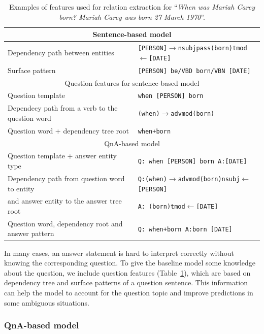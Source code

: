\begin{table}[t]
\footnotesize
\centering
\begin{tabular}{p{6.2cm}|p{6.6cm}}
\multicolumn{2}{c}{Sentence-based model}\\
\hline
Dependency path between entities & \texttt{[PERSON]$\rightarrow$nsubjpass(born)tmod$\leftarrow$[DATE]}\\
Surface pattern & \texttt{[PERSON] be/VBD born/VBN [DATE]}\\
\hline
\multicolumn{2}{c}{Question features for sentence-based model}\\
\hline
Question template & \texttt{when [PERSON] born}\\
Dependecy path from a verb to the question word & \texttt{(when)$\rightarrow$advmod(born)}\\
Question word + dependency tree root & \texttt{when+born}\\
\hline
\multicolumn{2}{c}{QnA-based model}\\
\hline
Question template + answer entity type & \texttt{Q: when [PERSON] born A:[DATE]}\\
Dependency path from question word to entity & \texttt{Q:(when)$\rightarrow$advmod(born)nsubj$\leftarrow$[PERSON]}\\
and answer entity to the answer tree root & \texttt{A: (born)tmod$\leftarrow$[DATE]}\\
Question word, dependency root and answer pattern & \texttt{Q: when+born A:born [DATE]}\\
\end{tabular}
\caption{Examples of features used for relation extraction for ``\emph{When was Mariah Carey born? Mariah Carey was born 27 March 1970}''.}
\label{table:factoid:cqarelextract:features}
\end{table}

In many cases, an answer statement is hard to interpret correctly without knowing the corresponding question.
To give the baseline model some knowledge about the question, we include question features (Table~\ref{table:factoid:cqarelextract:features}), which are based on dependency tree and surface patterns of a question sentence. 
This information can help the model to account for the question topic and improve predictions in some ambiguous situations.

\subsubsection{QnA-based model}
\label{section:factoid:cqarelextract:models:qnamodel}


